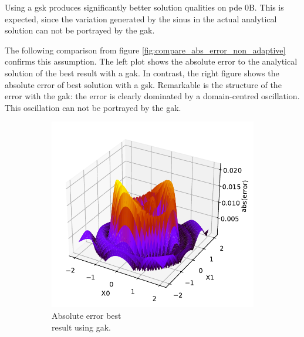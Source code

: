 \documentclass[./\jobname.tex]{subfiles}
\begin{document}
Using a \gls{gsk} produces significantly better solution qualities on \gls{pde} 0B. This is expected, since the variation generated by the sinus in the actual analytical solution can not be portrayed by the \gls{gak}. 

The following comparison from figure \ref{fig:compare_abs_error_non_adaptive} confirms this assumption. The left plot shows the absolute error to the analytical solution of the best result with a \gls{gak}. In contrast, the right figure shows the absolute error of best solution with a \gls{gsk}. Remarkable is the structure of the error with the \gls{gak}: the error is clearly dominated by a domain-centred oscillation. This oscillation can not be portrayed by the \gls{gak}.  

\begin{figure}[H]
	\centering
	\begin{subfigure}[b]{0.4\linewidth}
		\centering
		\includegraphics[width=1\textwidth]{../../code/experiments/experiment_3/pde0b_ex1_abs_error.pdf}
		\caption{Absolute error best\\ result using \gls{gak}. }
		\label{fig:pde0b_ex1_abs_error}
	\end{subfigure}%
	\begin{subfigure}[b]{0.4\linewidth}
		\centering

\end{subfigure}
\end{figure}
\end{document}
